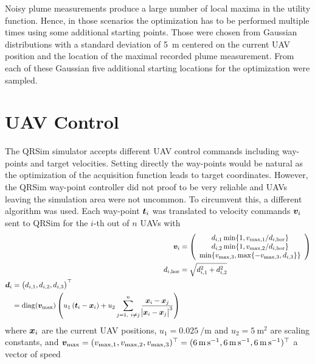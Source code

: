 Noisy plume measurements produce a large number of local maxima in the utility 
function. Hence, in those scenarios the optimization has to be performed 
multiple times using some additional starting points. Those were chosen from 
Gaussian distributions with a standard deviation of \SI{5}{\meter} centered on 
the current UAV position and the location of the maximal recorded plume 
measurement. From each of these Gaussian five additional starting locations for 
the optimization were sampled.

\section{UAV Control}
The QRSim simulator accepts different UAV control commands including way-points 
and target velocities. Setting directly the way-points would be natural as the 
optimization of the acquisition function leads to target coordinates. However, 
the QRSim way-point controller did not proof to be very reliable and UAVs 
leaving the simulation area were not uncommon. To circumvent this, a different 
algorithm was used. Each way-point $\bm{t}_i$ was translated to velocity commands 
$\bm{v}_i$ sent to QRSim for the $i$-th out of $n$ UAVs with
\begin{align}
        \vc v_i &= \del{\begin{array}{c}
            d_{i, 1} \min\{1, v_{\max,1} / d_{i,\mathrm{hor}}\} \\
            d_{i, 2} \min\{1, v_{\max,2} / d_{i,\mathrm{hor}}\} \\
            \min\{v_{\max,3}, \max\{-v_{\max,3}, d_{i, 3}\}\}
        \end{array}} \label{eqn:final_velocities} \\
        d_{i,\mathrm{hor}} &= \sqrt{d_{i, 1}^2 + d_{i, 2}^2} \\
    \begin{split}
        \vc d_i &= \del{d_{i,1}, d_{i,2}, d_{i,3}}\Tr \\
        &= \diag\!\del{\vc v\ped{\max}} \del{u_1 \del{\vc t_i - \vc x_i} + u_2 
            \sum_{j = 1,\ i \neq j}^{n} \frac{\vc x_i - \vc x_j}{\abs{\vc x_i 
                    - \vc x_j}^3}}
    \end{split}
\end{align}
where $\bm{x}_i$ are the current UAV positions, $u_1 = \SI{0.025}{\per\meter}$ 
and $u_2 = \SI{5}{\meter\squared}$ are scaling constants, and $\bm{v}_{\max} 
= (v_{\max,1}, v_{\max,2}, v_{\max,3})^{\top} = (\SI{6}{\meter\per\second}, 
\SI{6}{\meter\per\second}, \SI{6}{\meter\per\second})^{\top}$ a vector of speed 
